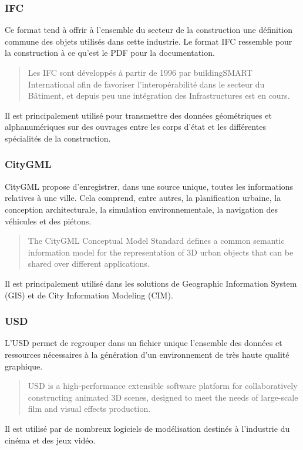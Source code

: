 \subsubsection{IFC}
Ce format tend à offrir à l'ensemble du secteur de la construction une définition commune des objets utilisés dans cette industrie. Le format IFC ressemble pour la construction à ce qu'est le PDF pour la documentation.\cite{ffbatimentQuestceQuun}
\begin{quote}
    Les IFC sont développés à partir de 1996 par buildingSMART International afin de favoriser l’interopérabilité dans le secteur du Bâtiment, et depuis peu une intégration des Infrastructures est en cours. \cite{picinbonoIFCPratique2018}
\end{quote}
Il est principalement utilisé pour transmettre des données géométriques et alphanumériques sur des ouvrages entre les corps d'état et les différentes spécialités de la construction.

\subsubsection{CityGML}
CityGML propose d'enregistrer, dans une source unique, toutes les informations relatives à une ville. Cela comprend, entre autres, la planification urbaine, la conception architecturale, la simulation environnementale, la navigation des véhicules et des piétons.
\begin{quote}
    The CityGML Conceptual Model Standard defines a common semantic information model for the representation of 3D urban objects that can be shared over different applications. \cite{kolbeOGCCityGeography2021}
\end{quote}
Il est principalement utilisé dans les solutions de Geographic Information System (GIS) et de City Information Modeling (CIM).

\subsubsection{USD}
L'USD permet de regrouper dans un fichier unique l'ensemble des données et ressources nécessaires à la génération d'un environnement de très haute qualité graphique. 
\begin{quote}
    USD is a high-performance extensible software platform for collaboratively constructing animated 3D scenes, designed to meet the needs of large-scale film and visual effects production. \cite{noauthor_usd_nodate}
\end{quote}
Il est utilisé par de nombreux logiciels de modélisation destinés à l'industrie du cinéma et des jeux vidéo.

